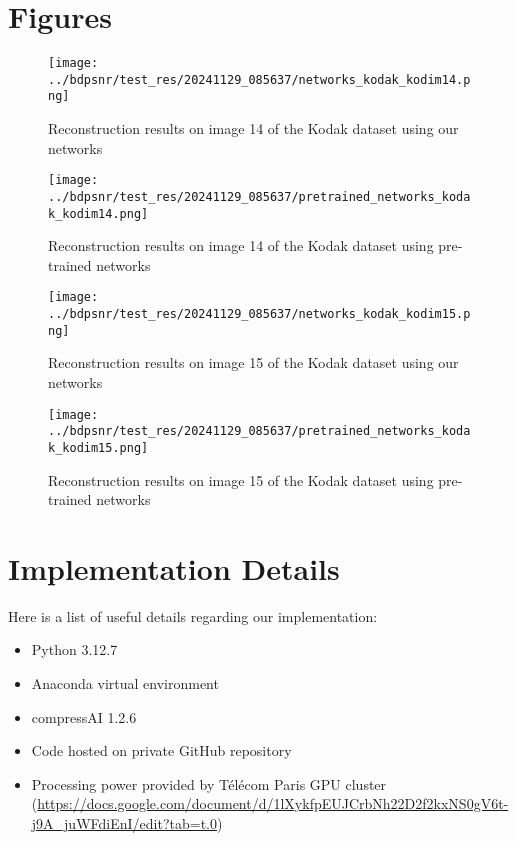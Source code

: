 \appendix

\chapter{Figures}

\begin{figure}
    \centering
    \texttt{[image: ../bdpsnr/test\_res/20241129\_085637/networks\_kodak\_kodim14.png]}
    \caption{Reconstruction results on image 14 of the Kodak dataset using our networks}
    \label{bdpsnr_1a_app}
\end{figure}

\begin{figure}
    \centering
    \texttt{[image: ../bdpsnr/test\_res/20241129\_085637/pretrained\_networks\_kodak\_kodim14.png]}
    \caption{Reconstruction results on image 14 of the Kodak dataset using pre-trained networks}
    \label{bdpsnr_1b_app}
\end{figure}

\begin{figure}
    \centering
    \texttt{[image: ../bdpsnr/test\_res/20241129\_085637/networks\_kodak\_kodim15.png]}
    \caption{Reconstruction results on image 15 of the Kodak dataset using our networks}
    \label{bdpsnr_2a_app}
\end{figure}

\begin{figure}
    \centering
    \texttt{[image: ../bdpsnr/test\_res/20241129\_085637/pretrained\_networks\_kodak\_kodim15.png]}
    \caption{Reconstruction results on image 15 of the Kodak dataset using pre-trained networks}
    \label{bdpsnr_2b_app}
\end{figure}

\chapter{Implementation Details}
Here is a list of useful details regarding our implementation:
\begin{itemize}
    \item Python 3.12.7
    \item Anaconda virtual environment
    \item compressAI 1.2.6
    \item Code hosted on private GitHub repository
    \item Processing power provided by Télécom Paris GPU cluster (\url{https://docs.google.com/document/d/1lXykfpEUJCrbNh22D2f2kxNS0gV6t-j9A_juWFdiEnI/edit?tab=t.0})
\end{itemize}